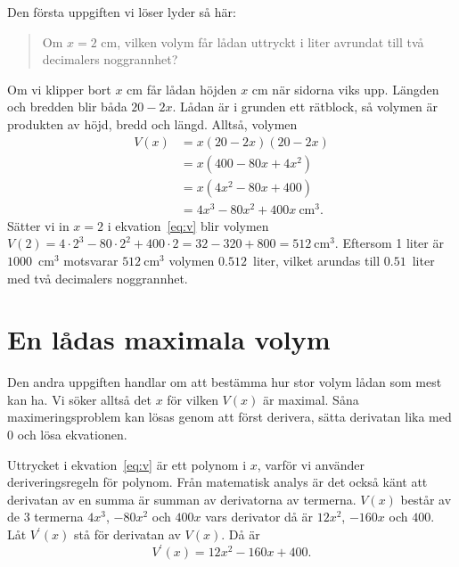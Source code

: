 \documentclass[a4paper,12pt]{article}
\begin{document}
Den första uppgiften vi löser lyder så här:
%
\begin{quote}
  Om $x = 2$ cm, vilken volym får lådan uttryckt i liter avrundat till
  två decimalers noggrannhet?  
\end{quote}
%
Om vi klipper bort $x$ cm får lådan höjden $x$ cm när sidorna viks
upp. Längden och bredden blir båda $20 - 2x$. Lådan är i grunden ett
rätblock, så volymen är produkten av höjd, bredd och längd. Alltså,
volymen 
%
\begin{align}
  V(x) &= x (20 - 2x) (20 - 2x)    \nonumber \\
       &= x (400   - 80x   + 4x^2) \nonumber \\
       &= x (4x^2  - 80x   + 400)  \nonumber \\
       &=    4x^3  - 80x^2 + 400x ~\text{cm}^3.  \label{eq:v}
\end{align}
%
Sätter vi in $x = 2$ i ekvation~\ref{eq:v} blir volymen
%
  $V(2) = 4 \cdot 2^3 - 80 \cdot 2^2 + 400 \cdot 2
        = 32          - 320          + 800
        = 512~\text{cm}^3.$
%
Eftersom 1 liter är $1000$~cm$^3$ motsvarar $512~\text{cm}^3$ volymen
$0.512$~liter, vilket arundas till $0.51$~liter med två decimalers
noggrannhet. 

\section{En lådas maximala volym}

Den andra uppgiften handlar om att bestämma hur stor volym lådan som
mest kan ha. Vi söker alltså det $x$ för vilken $V(x)$ är
maximal. Såna maximeringsproblem kan lösas genom att först derivera, 
sätta derivatan lika med $0$ och lösa ekvationen. 

Uttrycket i ekvation~\ref{eq:v} är ett polynom i $x$, varför vi
använder deriveringsregeln för polynom. Från matematisk analys är det
också känt att derivatan av en summa är summan av derivatorna av
termerna. $V(x)$ består av de 3 termerna $4x^3$,  $-80x^2$ och $400x$
vars derivator då är $12x^2$,  $-160x$ och $400$. Låt $V^\prime(x)$ stå
för derivatan av $V(x)$. Då är
%
\begin{equation}
  \label{eq:vprime}
  V^\prime(x) = 12x^2 - 160x + 400. 
\end{equation}
\end{document}
